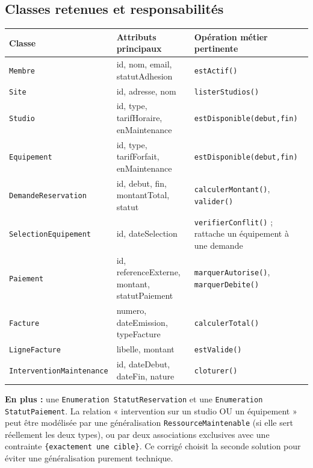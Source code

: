 \documentclass[10pt,a4paper]{article}
\begin{document}
\subsection{Classes retenues et responsabilités}
\begin{longtable}{@{}p{43mm}p{51mm}p{60mm}@{}}
\toprule
Classe & Attributs principaux & Opération métier pertinente \\
\midrule\endhead
\texttt{Membre} & id, nom, email, statutAdhesion & \texttt{estActif()} \\
\texttt{Site} & id, adresse, nom & \texttt{listerStudios()} \\
\texttt{Studio} & id, type, tarifHoraire, enMaintenance & \texttt{estDisponible(debut,fin)} \\
\texttt{Equipement} & id, type, tarifForfait, enMaintenance & \texttt{estDisponible(debut,fin)} \\
\texttt{DemandeReservation} & id, debut, fin, montantTotal, statut & \texttt{calculerMontant()}, \texttt{valider()} \\
\texttt{SelectionEquipement} & id, dateSelection & \texttt{verifierConflit()} ; rattache un équipement à une demande \\
\texttt{Paiement} & id, referenceExterne, montant, statutPaiement & \texttt{marquerAutorise()}, \texttt{marquerDebite()} \\
\texttt{Facture} & numero, dateEmission, typeFacture & \texttt{calculerTotal()} \\
\texttt{LigneFacture} & libelle, montant & \texttt{estValide()} \\
\texttt{InterventionMaintenance} & id, dateDebut, dateFin, nature & \texttt{cloturer()} \\
\bottomrule
\end{longtable}
\textbf{En plus :} une \texttt{Enumeration StatutReservation} et une \texttt{Enumeration StatutPaiement}. La relation « intervention sur un studio OU un équipement » peut être modélisée par une généralisation \texttt{RessourceMaintenable} (si elle sert réellement les deux types), ou par deux associations exclusives avec une contrainte \texttt{\{exactement une cible\}}. Ce corrigé choisit la seconde solution pour éviter une généralisation purement technique.
\end{document}
